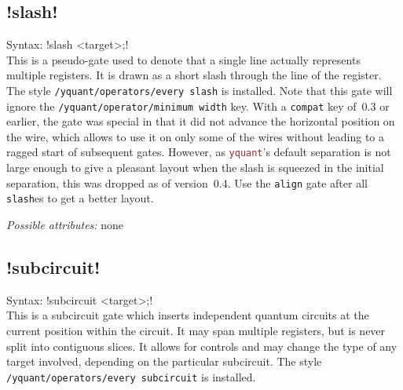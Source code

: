 \documentclass{scrartcl}
\def\pkg#1{\textcolor{brown}{\texttt{#1}}}
\def\ttlink{\link\texttt}
\def\Yquant{\pkg{yquant}}
\begin{document}
      \subsection[\texorpdfstring{\yquant{slash}}{slash}]{\yquant!slash!}
         Syntax: \yquant!slash <target>;! \\
         This is a pseudo\hyp gate used to denote that a single line actually represents multiple registers.
         It is drawn as a short slash through the line of the register.
         The style \ttlink{/yquant/operators/every slash} is installed.
         Note that this gate will ignore the \ttlink{/yquant/operator/minimum width} key.
         With a \ttlink{compat} key of~0.3 or earlier, the gate was special in that it did not advance the horizontal position on the wire, which allows to use it on only some of the wires without leading to a ragged start of subsequent gates.
         However, as \Yquant's default separation is not large enough to give a pleasant layout when the slash is squeezed in the initial separation, this was dropped as of version~0.4.
         Use the \ttlink{align} gate after all \ttlink{slash}es to get a better layout.

         \emph{Possible attributes:} none

      \subsection[\texorpdfstring{\yquant{subcircuit}}{subcircuit}]{\yquant!subcircuit!}
         Syntax: \yquant!subcircuit <target>;! \\
         This is a subcircuit gate which inserts independent quantum circuits at the current position within the circuit.
         It may span multiple registers, but is never split into contiguous slices.
         It allows for controls and may change the type of any target involved, depending on the particular subcircuit.
         The style \ttlink{/yquant/operators/every subcircuit} is installed.
\end{document}
